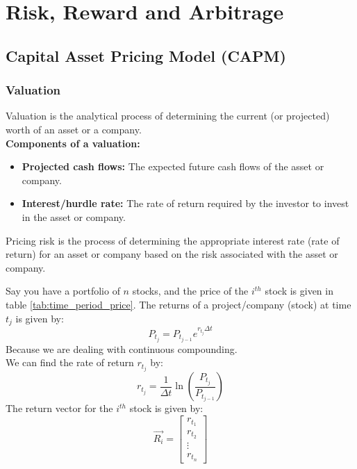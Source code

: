 \chapter{Risk, Reward and Arbitrage}


\section{Capital Asset Pricing Model (CAPM)}

\subsection{Valuation}

\begin{definition}
    Valuation is the analytical process of determining the current (or projected) worth of an asset or a company. \\
    \textbf{Components of a valuation:}
    \begin{itemize}
        \item \textbf{Projected cash flows:} The expected future cash flows of the asset or company.
        \item \textbf{Interest/hurdle rate:} The rate of return required by the investor to invest in the asset or company.
    \end{itemize}
\end{definition}

\begin{definition}
    Pricing risk is the process of determining the appropriate interest rate (rate of return) for an asset or company based on the risk associated with the asset or company.
\end{definition}

\begin{theorem}
    Say you have a portfolio of $n$ stocks, and the price of the $i^{th}$ stock is given in table \ref{tab:time_period_price}. The returns of a project/company (stock) at time $t_j$ is given by:
    \begin{equation}
        P_{t_j} = P_{t_{j-1}} e^{r_{t_{j}}\Delta t}
    \end{equation}
    Because we are dealing with continuous compounding.\\
    We can find the rate of return $r_{t_{j}}$ by:
    \begin{equation}
        r_{t_{j}} = \frac{1}{\Delta t} \ln\left(\frac{P_{t_j}}{P_{t_{j-1}}}\right)
    \end{equation}
    The return vector for the $i^{th}$ stock is given by:
    \begin{equation}
        \overrightarrow{R_i} =  \begin{bmatrix}
            r_{t_1} \\
            r_{t_2} \\
            \vdots  \\
            r_{t_n}
        \end{bmatrix}
    \end{equation}
\end{theorem}

